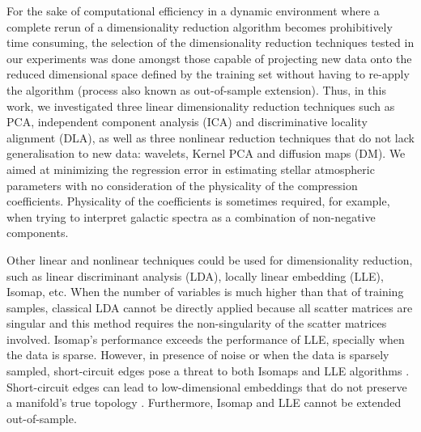 \documentclass[a4paper,fleqn,usenatbib]{mnras}
\begin{document}
For the sake of computational efficiency in a dynamic environment
where a complete rerun of a dimensionality reduction algorithm becomes
prohibitively time consuming, the selection of the dimensionality
reduction techniques tested in our experiments was done amongst those
capable of projecting new data onto the reduced dimensional space
defined by the training set without having to re-apply the algorithm
(process also known as out-of-sample extension). Thus, in this work,
we investigated three linear dimensionality reduction techniques such
as PCA, independent component analysis (ICA) and discriminative
locality alignment (DLA), as well as three nonlinear reduction
techniques that do not lack generalisation to new data: wavelets,
Kernel PCA and diffusion maps (DM).  We aimed at minimizing the
regression error in estimating stellar atmospheric parameters with no
consideration of the physicality of the compression
coefficients. Physicality of the coefficients is sometimes required,
for example, when trying to interpret galactic spectra as a
combination of non-negative components.

Other linear and nonlinear techniques could be used for dimensionality
reduction, such as linear discriminant analysis (LDA), locally linear
embedding (LLE), Isomap, etc. When the number of variables is much
higher than that of training samples, classical LDA cannot be directly
applied because all scatter matrices are singular and this method
requires the non-singularity of the scatter matrices involved.
Isomap's performance exceeds the performance of LLE, specially when
the data is sparse. However, in presence of noise or when the data is
sparsely sampled, short-circuit edges pose a threat to both Isomaps
and LLE algorithms \citep{saxena:04}. Short-circuit edges can lead to
low-dimensional embeddings that do not preserve a manifold's true
topology \citep{balasubramanianISOMAP:02}. Furthermore, Isomap and LLE
cannot be extended out-of-sample. 

\end{document}
